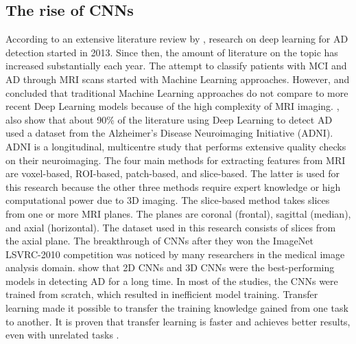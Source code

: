 \documentclass[11pt, a4paper]{article}
\begin{document}
\subsection{The rise of CNNs} \label{subs:CNN}
According to an extensive literature review by \cite{Ebrahimighahnavieh2020DeepReview}, research on deep learning for AD detection started in 2013. Since then, the amount of literature on the topic has increased substantially each year. The attempt to classify patients with MCI and AD through MRI scans started with Machine Learning approaches. However, \cite{Razzak2018DeepMaking} and \cite{Ebrahimighahnavieh2020DeepReview} concluded that traditional Machine Learning approaches do not compare to more recent Deep Learning models because of the high complexity of MRI imaging. \cite{Ebrahimighahnavieh2020DeepReview}, also show that about 90\% of the literature using Deep Learning to detect AD used a dataset from the Alzheimer’s Disease Neuroimaging Initiative (ADNI). ADNI is a longitudinal, multicentre study that performs extensive quality checks on their neuroimaging. The four main methods for extracting features from MRI are voxel-based, ROI-based, patch-based, and slice-based. The latter is used for this research because the other three methods require expert knowledge or high computational power due to 3D imaging. The slice-based method takes slices from one or more MRI planes. The planes are coronal (frontal), sagittal (median), and axial (horizontal). The dataset used in this research consists of slices from the axial plane. The breakthrough of CNNs after they won the ImageNet LSVRC-2010 competition was noticed by many researchers in the medical image analysis domain. \cite{Ebrahimighahnavieh2020DeepReview} show that 2D CNNs and 3D CNNs were the best-performing models in detecting AD for a long time. In most of the studies, the CNNs were trained from scratch, which resulted in inefficient model training. Transfer learning made it possible to transfer the training knowledge gained from one task to another. It is proven that transfer learning is faster and achieves better results, even with unrelated tasks \citep{Valliani2017DeepDiagnosis,Hon2017TowardsLearning}.
\end{document}
